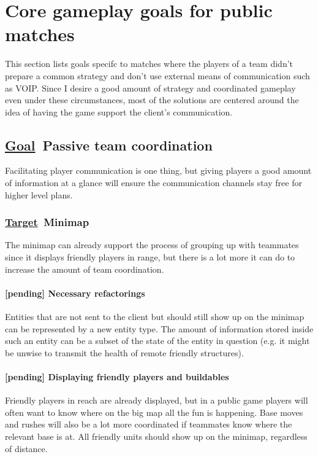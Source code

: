 \documentclass{scrartcl}
\newcommand{\goal}     [0]{\textbf{\underline{Goal}\ }}
\newcommand{\target}   [0]{\textbf{\underline{Target}\ }}
\newcommand{\pending}  [0]{\textcolor{pending}  {\textbf{[pending] }}}
\begin{document}
\section{Core gameplay goals for public matches}

This section lists goals specifc to matches where the players of a team didn't prepare a common strategy and don't use external means of communication such as VOIP. Since I desire a good amount of strategy and coordinated gameplay even under these circumstances, most of the solutions are centered around the idea of having the game support the client's communication.

\subsection{\goal Passive team coordination}

Facilitating player communication is one thing, but giving players a good amount of information at a glance will ensure the communication channels stay free for higher level plans.

\subsubsection{\target Minimap}

The minimap can already support the process of grouping up with teammates since it displays friendly players in range, but there is a lot more it can do to increase the amount of team coordination.

\paragraph{\pending Necessary refactorings}

Entities that are not sent to the client but should still show up on the minimap can be represented by a new entity type. The amount of information stored inside such an entity can be a subset of the state of the entity in question (e.g. it might be unwise to transmit the health of remote friendly structures).

\paragraph{\pending Displaying friendly players and buildables}

Friendly players in reach are already displayed, but in a public game players will often want to know where on the big map all the fun is happening. Base moves and rushes will also be a lot more coordinated if teammates know where the relevant base is at. All friendly units should show up on the minimap, regardless of distance.
\end{document}
